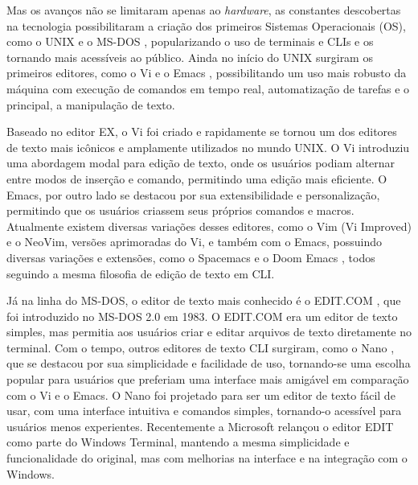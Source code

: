 Mas os avanços não se limitaram apenas ao \textit{hardware}, as constantes descobertas
na tecnologia possibilitaram a criação dos primeiros Sistemas Operacionais (OS),
como o UNIX \cite{UnixArchive} e o MS-DOS \cite{ComputerHistoryMuseum}, popularizando
o uso de terminais e CLIs e os tornando mais acessíveis ao público. Ainda no
início do UNIX surgiram os primeiros editores, como o Vi \cite{Joy_Vi} e o Emacs
\cite{Stallman1981}, possibilitando um uso mais robusto da máquina com execução
de comandos em tempo real, automatização de tarefas e o principal, a manipulação
de texto.

Baseado no editor EX, o Vi foi criado e rapidamente se tornou um dos editores de
texto mais icônicos e amplamente utilizados no mundo UNIX. O Vi introduziu uma
abordagem modal para edição de texto, onde os usuários podiam alternar entre modos
de inserção e comando, permitindo uma edição mais eficiente. O Emacs, por outro
lado se destacou por sua extensibilidade e personalização, permitindo que os usuários
criassem seus próprios comandos e macros. Atualmente existem diversas variações
desses editores, como o Vim (Vi Improved) \cite{Vim} e o NeoVim,
\cite{Neovim_Project} versões aprimoradas do Vi, e também com o Emacs, possuindo
diversas variações e extensões, como o Spacemacs \cite{Spacemacs} e o Doom Emacs
\cite{DoomEmacs}, todos seguindo a mesma filosofia de edição de texto em CLI.

Já na linha do MS-DOS, o editor de texto mais conhecido é o EDIT.COM \cite{MicrosoftEdit2025},
que foi introduzido no MS-DOS 2.0 em 1983. O EDIT.COM era um editor de texto
simples, mas permitia aos usuários criar e editar arquivos de texto diretamente no
terminal. Com o tempo, outros editores de texto CLI surgiram, como o Nano
\cite{Nano2025}, que se destacou por sua simplicidade e facilidade de uso,
tornando-se uma escolha popular para usuários que preferiam uma interface mais
amigável em comparação com o Vi e o Emacs. O Nano foi projetado para ser um editor
de texto fácil de usar, com uma interface intuitiva e comandos simples, tornando-o
acessível para usuários menos experientes. Recentemente a Microsoft relançou o
editor EDIT como parte do Windows Terminal, mantendo a mesma simplicidade e funcionalidade
do original, mas com melhorias na interface e na integração com o Windows.

